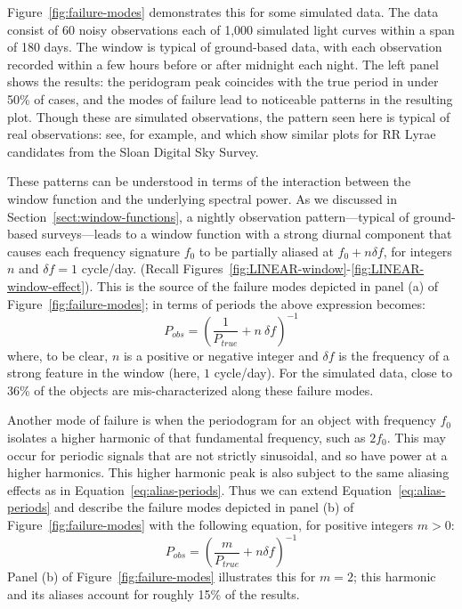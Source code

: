 \documentclass[preprint]{aastex}
\newcommand{\fig}[1]{Figure~\ref{fig:#1}}
\newcommand{\figs}[2]{Figures~\ref{fig:#1}-\ref{fig:#2}}
\newcommand{\Eq}[1]{Equation~\ref{eq:#1}}
\newcommand{\eq}[1]{\Eq{#1}}
\newcommand{\eqlabel}[1]{\label{eq:#1}}
\newcommand{\Sect}[1]{Section~\ref{sect:#1}}
\newcommand{\sect}[1]{\Sect{#1}}
\begin{document}
\fig{failure-modes} demonstrates this for some simulated data.
The data consist of 60 noisy observations each of 1,000 simulated light
curves within a span of 180 days.
The window is typical of ground-based data, with each observation recorded
within a few hours before or after midnight each night.
The left panel shows the results: the peridogram peak coincides with the true
period in under 50\% of cases, and the modes of failure lead to noticeable
patterns in the resulting plot.
Though these are simulated observations, the pattern seen here is typical of
real observations: see, for example, \citet{VanderPlas2015}
and \citet{Long2016} which show similar plots for RR Lyrae candidates from
the Sloan Digital Sky Survey.

These patterns can be understood in terms of the interaction between the
window function and the underlying spectral power.
As we discussed in \sect{window-functions},
a nightly observation pattern---typical of ground-based surveys---leads to
a window function with a strong diurnal component that causes each frequency
signature $f_0$ to be partially aliased at $f_0 + n \delta f$, for integers
$n$ and $\delta f = 1$ cycle/day.
(Recall \figs{LINEAR-window}{LINEAR-window-effect}).
This is the source of the failure modes depicted in panel (a) of
\fig{failure-modes}; in terms of periods the above expression becomes:
\begin{equation}
  P_{obs} = \left(\frac{1}{P_{true}} + n\ \delta f\right)^{-1}
  \eqlabel{alias-periods}
\end{equation}
where, to be clear, $n$ is a positive or negative integer and $\delta f$ is
the frequency of a strong feature in the window  (here, $1$ cycle/day).
For the simulated data, close to 36\% of the objects are mis-characterized
along these failure modes.

Another mode of failure is when the periodogram for an object with frequency
$f_0$ isolates a higher harmonic of that fundamental frequency, such as $2f_0$.
This may occur for periodic signals that are not strictly sinusoidal, and so
have power at a higher harmonics.
This higher harmonic peak is also subject to the same aliasing
effects as in \eq{alias-periods}.
Thus we can extend \eq{alias-periods} and describe the failure modes depicted
in panel (b) of \fig{failure-modes} with the following equation,
for positive integers $m > 0$:
\begin{equation}
  P_{obs} = \left(\frac{m}{P_{true}} + n\delta f\right)^{-1}
  \eqlabel{alias-harmonic-periods}
\end{equation}
Panel (b) of \fig{failure-modes} illustrates this for $m=2$; this harmonic and
its aliases account for roughly 15\% of the results.
\end{document}
